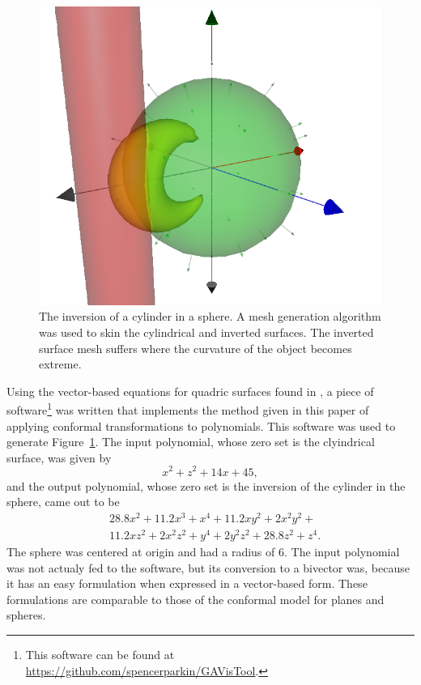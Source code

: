 \documentclass{ecgd-l}
\numberwithin{equation}{section}
\begin{document}
\begin{figure}
\includegraphics[scale=0.3]{InvertCylinderInSphere}
\caption{The inversion of a cylinder in a sphere.  A mesh generation algorithm was used to skin
the cylindrical and inverted surfaces.  The inverted surface mesh suffers where the curvature
of the object becomes extreme.}
\label{fig_invert_cylinder_in_sphere}
\end{figure}

Using the vector-based equations for quadric surfaces found in \cite{Miller87},
a piece of software\footnote{This software can be found at \url{https://github.com/spencerparkin/GAVisTool}.}
was written that implements the method given in this paper of
applying conformal transformations to polynomials.  This software was used
to generate Figure~\ref{fig_invert_cylinder_in_sphere}.  The input
polynomial, whose zero set is the clyindrical surface, was given by
\begin{equation*}
x^2 + z^2 + 14x + 45,
\end{equation*}
and the output polynomial, whose zero set is the inversion of the cylinder in the sphere,
came out to be
\begin{equation*}
\begin{split}
&28.8x^{2} + 11.2x^{3} + x^{4} + 11.2xy^{2} + 2x^{2}y^{2} + \\
&11.2xz^{2} + 2x^{2}z^{2} + y^{4} + 2y^{2}z^{2} + 28.8z^{2} + z^{4}.
\end{split}
\end{equation*}
The sphere was centered at origin and had a radius of 6.  The input polynomial
was not actualy fed to the software, but its conversion to a bivector was, because
it has an easy formulation when expressed in a vector-based form.  These formulations
are comparable to those of the conformal model for planes and spheres.
\end{document}
